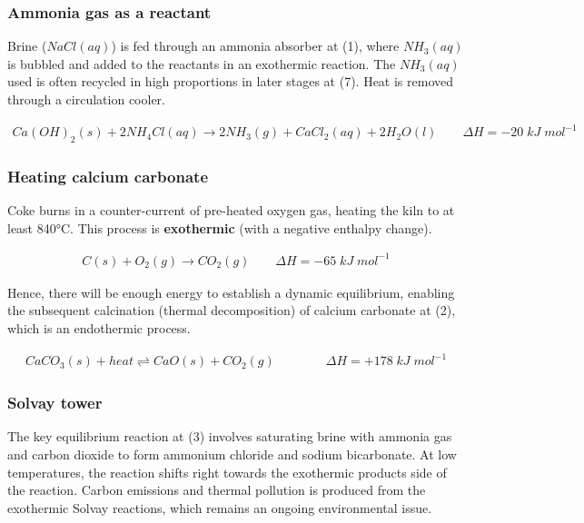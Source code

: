 \documentclass[12pt, a4paper]{article}
\begin{document}
\subsubsection{Ammonia gas as a reactant}

Brine (\(NaCl(aq)\)) is fed through an ammonia absorber at (1), where \(NH_{3}(aq)\) is bubbled and added to the reactants in an exothermic reaction. The \(NH_{3}(aq)\) used is often recycled in high proportions in later stages at (7). Heat is removed through a circulation cooler.

\begin{align}
	Ca(OH)_{2}(s) + 2NH_{4}Cl(aq) \rightarrow 2NH_{3}(g) + CaCl_{2}(aq) + 2H_{2}O(l) \qquad \Delta H = -20 \; kJ \; mol^{-1}
\end{align}


\subsubsection{Heating calcium carbonate}

Coke burns in a counter-current of pre-heated oxygen gas, heating the kiln to at least 840°C. This process is \textbf{exothermic} (with a negative enthalpy change).

\begin{align}
	C(s) + O_{2}(g) \rightarrow CO_{2}(g) \qquad \Delta H = -65 \; kJ \; mol^{-1}
\end{align}

Hence, there will be enough energy to establish a dynamic equilibrium, enabling the subsequent calcination (thermal decomposition) of calcium carbonate at (2), which is an endothermic process.

\begin{align}
	CaCO_{3}(s) + heat \rightleftharpoons CaO(s) + CO_{2}(g) \qquad \qquad \Delta H = +178 \; kJ \; mol^{-1}
\end{align}

\subsubsection{Solvay tower}

The key equilibrium reaction at (3) involves saturating brine with ammonia gas and carbon dioxide to form ammonium chloride and sodium bicarbonate. At low temperatures, the reaction shifts right towards the exothermic products side of the reaction. Carbon emissions and thermal pollution is produced from the exothermic Solvay reactions, which remains an ongoing environmental issue.
\end{document}
